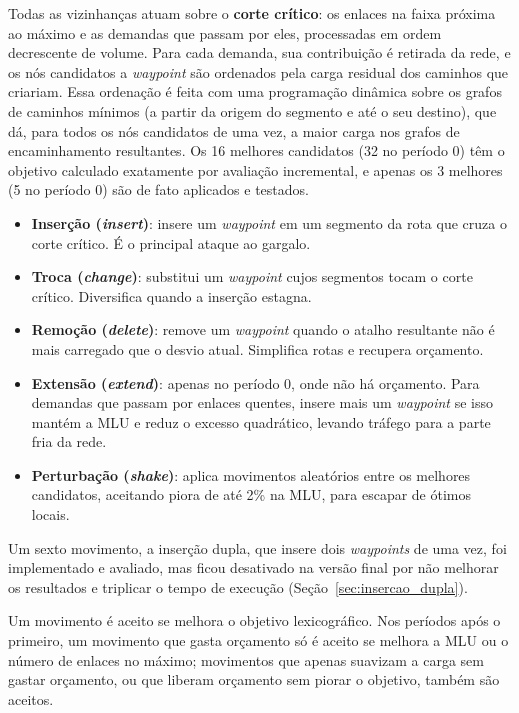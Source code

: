 Todas as vizinhanças atuam sobre o \textbf{corte crítico}: os enlaces na faixa próxima ao máximo e as demandas que passam por eles, processadas em ordem decrescente de volume. Para cada demanda, sua contribuição é retirada da rede, e os nós candidatos a \textit{waypoint} são ordenados pela carga residual dos caminhos que criariam. Essa ordenação é feita com uma programação dinâmica sobre os grafos de caminhos mínimos (a partir da origem do segmento e até o seu destino), que dá, para todos os nós candidatos de uma vez, a maior carga nos grafos de encaminhamento resultantes. Os 16 melhores candidatos (32 no período 0) têm o objetivo calculado exatamente por avaliação incremental, e apenas os 3 melhores (5 no período 0) são de fato aplicados e testados.

\begin{itemize}
    \item \textbf{Inserção (\textit{insert})}: insere um \textit{waypoint} em um segmento da rota que cruza o corte crítico. É o principal ataque ao gargalo.
    \item \textbf{Troca (\textit{change})}: substitui um \textit{waypoint} cujos segmentos tocam o corte crítico. Diversifica quando a inserção estagna.
    \item \textbf{Remoção (\textit{delete})}: remove um \textit{waypoint} quando o atalho resultante não é mais carregado que o desvio atual. Simplifica rotas e recupera orçamento.
    \item \textbf{Extensão (\textit{extend})}: apenas no período 0, onde não há orçamento. Para demandas que passam por enlaces quentes, insere mais um \textit{waypoint} se isso mantém a MLU e reduz o excesso quadrático, levando tráfego para a parte fria da rede.
    \item \textbf{Perturbação (\textit{shake})}: aplica movimentos aleatórios entre os melhores candidatos, aceitando piora de até 2\% na MLU, para escapar de ótimos locais.
\end{itemize}

Um sexto movimento, a inserção dupla, que insere dois \textit{waypoints} de uma vez, foi implementado e avaliado, mas ficou desativado na versão final por não melhorar os resultados e triplicar o tempo de execução (Seção~\ref{sec:insercao_dupla}).

Um movimento é aceito se melhora o objetivo lexicográfico. Nos períodos após o primeiro, um movimento que gasta orçamento só é aceito se melhora a MLU ou o número de enlaces no máximo; movimentos que apenas suavizam a carga sem gastar orçamento, ou que liberam orçamento sem piorar o objetivo, também são aceitos.

